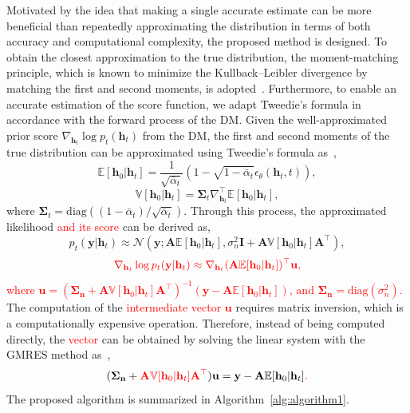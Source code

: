 \documentclass[lettersize,journal]{IEEEtran}
\newcommand{\tred}{\textcolor{red}}
\begin{document}
Motivated by the idea that making a single accurate estimate can be more beneficial than repeatedly approximating the distribution in terms of both accuracy and computational complexity, the proposed method is designed. To obtain the closest approximation to the true distribution, the moment-matching principle, which is known to minimize the Kullback–Leibler divergence by matching the first and second moments, is adopted~\cite{bishopPatternRecognitionMachine2006}. Furthermore, to enable an accurate estimation of the score function, we adapt Tweedie’s formula in accordance with the forward process of the DM.
Given the well-approximated prior score $\nabla_{\mathbf{h}_{t}}\log p_{t}(\mathbf{h}_{t})$ from the DM, the first and second moments of the true distribution can be approximated using Tweedie's formula as~\cite{efronTweediesFormulaSelection2011},
\begin{equation}
\mathbb{E}[\mathbf{h}_{0}|\mathbf{h}_{t}] = \frac{1}{\sqrt{ \bar{\alpha}_{t} }}(1-\sqrt{ 1-\bar{\alpha}_{t} }\epsilon_{\theta}(\mathbf{h}_{t},t)),
\end{equation}
\begin{equation}
\mathbb{V}[\mathbf{h}_{0}|\mathbf{h}_{t}] = \boldsymbol{\Sigma}_{t}\nabla_{\mathbf{h}_{t}}^{\top}\mathbb{E}[\mathbf{h}_{0}|\mathbf{h}_{t}],
\end{equation}
where $\boldsymbol{\Sigma}_{t} = \text{diag}((1-\bar{\alpha}_{t}) / \sqrt{ \bar{\alpha}_{t} })$. Through this process, the approximated likelihood \tred{and its score} can be derived as,
\begin{equation}
p_{t}(\mathbf{y}|\mathbf{h}_{t}) \approx \mathcal{N}(\mathbf{y}; \mathbf{A}\mathbb{E}[\mathbf{h}_{0}|\mathbf{h}_{t}], \sigma_{n}^{2}\mathbf{I}+\mathbf{A}\mathbb{V}[\mathbf{h}_{0}|\mathbf{h}_{t}]\mathbf{A}^{\top}),
\end{equation}
\begin{equation}
\tred{\nabla_{\mathbf{h}_{t}}\log p_{t}(\mathbf{y}|\mathbf{h}_{t}) \approx \nabla_{\mathbf{h}_{t}} (\mathbf{A}\mathbb{E}[\mathbf{h}_{0}|\mathbf{h}_{t}])^{\top}\mathbf{u},}
\end{equation}
\tred{where $\mathbf{u} = (\boldsymbol{\Sigma}_{\mathbf{n}}+\mathbf{A}\mathbb{V}[\mathbf{h}_{0}|\mathbf{h}_{t}]\mathbf{A}^{\top})^{-1}(\mathbf{y}- \mathbf{A}\mathbb{E}[\mathbf{h}_{0}|\mathbf{h}_{t}])$, and $\boldsymbol{\Sigma}_{\mathbf{n}} = \text{diag}(\sigma_{n}^{2})$.} The computation of the \tred{intermediate vector $\mathbf{u}$} requires matrix inversion, which is a computationally expensive operation. Therefore, instead of being computed directly, the \tred{vector} can be obtained by solving the linear system with the GMRES method as~\cite{saadGMRESGeneralizedMinimal1986},
\begin{equation}
(\boldsymbol{\Sigma}_{\mathbf{n}}+\tred{\mathbf{A}\mathbb{V}[\mathbf{h}_{0}|\mathbf{h}_{t}]\mathbf{A}^{\top}})\mathbf{u} = \mathbf{y}- \mathbf{A}\mathbb{E}[\mathbf{h}_{0}|\mathbf{h}_{t}]\tred{.}
\end{equation}
The proposed algorithm is summarized in Algorithm~\ref{alg:algorithm1}.
\end{document}
